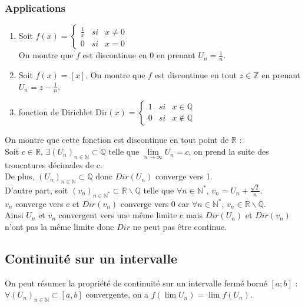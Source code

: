 \documentclass[a4paper,10pt]{book} %
\newcommand{\R}{\mathbb{R}}
\newcommand{\N}{\mathbb{N}}
\newcommand{\Z}{\mathbb{Z}}
\newcommand{\Q}{\mathbb{Q}}
\begin{document}
\subsubsection{Applications}
\begin{enumerate} \item Soit $f(x)=\left\{\begin{array}{rcl}
\frac{1}{x} & si& x\neq 0\\
0 & si& x=0
\end{array} \right.$\\
On montre que $f$ est discontinue en 0 en prenant $U_{n}=\frac{1}{n}$.\\

\item Soit $f(x)=[x]$. On montre que $f$ est discontinue en tout $z\in\Z$ en prenant $U_{n}=z-\frac{1}{n}$.\\

\item fonction de Dirichlet
$\text{Dir}(x)=\left\{\begin{array}{rcl}
1 & si& x\in\Q\\
0 & si& x\notin \Q
\end{array}\right.$ \end{enumerate}

On montre que cette fonction est discontinue en tout point de $\R$ :\\
Soit $c\in \R$, $\exists (U_{n})_{n\in \N}\subset\Q$ telle que $\lim\limits_{n\rightarrow \infty}U_{n}=c$, on prend la suite des troncatures décimales de c.\\
De plus, $(U_{n})_{n\in\N}\subset \Q$ donc $Dir(U_{n})$ converge vers 1.\\

D'autre part, soit $(v_{n})_{n\in \N^{*}}\subset \R\backslash \Q$ telle que $\forall n\in \N^{*}$, $v_{n}=U_{n}+\frac{\sqrt{2}}{n}$.\\
$v_{n}$ converge vers c et $Dir(v_{n})$ converge vers 0 car $\forall n\in \N^{*}$, $v_{n}\in \R\backslash\Q$.\\

Ainsi $U_{n}$ et $v_{n}$ convergent vers une même limite c mais $Dir(U_{n})$ et $Dir(v_{n})$ n'ont pas la même limite donc $Dir$ ne peut pas être continue.

\subsection{Continuité sur un intervalle}
On peut résumer la propriété de continuité sur un intervalle fermé borné $[a;b]$ :\\
$\forall (U_{n})_{n\in\N} \subset [a,b]$ convergente, on a $f(\lim U_{n})=\lim f(U_{n})$.
\end{document}
